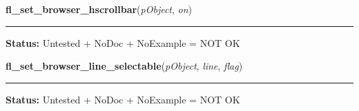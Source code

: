    \label{xformslib:library:fl_set_browser_hscrollbar}

    \vspace{0.5ex}

\hspace{.8\funcindent}\begin{boxedminipage}{\funcwidth}

    \raggedright \textbf{fl\_set\_browser\_hscrollbar}(\textit{pObject}, \textit{on})

    \vspace{-1.5ex}

    \rule{\textwidth}{0.5\fboxrule}
\setlength{\parskip}{2ex}
\setlength{\parskip}{1ex}
\textbf{Status:} Untested + NoDoc + NoExample = NOT OK



    \end{boxedminipage}

    \label{xformslib:library:fl_set_browser_line_selectable}

    \vspace{0.5ex}

\hspace{.8\funcindent}\begin{boxedminipage}{\funcwidth}

    \raggedright \textbf{fl\_set\_browser\_line\_selectable}(\textit{pObject}, \textit{line}, \textit{flag})

    \vspace{-1.5ex}

    \rule{\textwidth}{0.5\fboxrule}
\setlength{\parskip}{2ex}
\setlength{\parskip}{1ex}
\textbf{Status:} Untested + NoDoc + NoExample = NOT OK



    \end{boxedminipage}

    \label{xformslib:library:fl_get_browser_dimension}

    \vspace{0.5ex}

